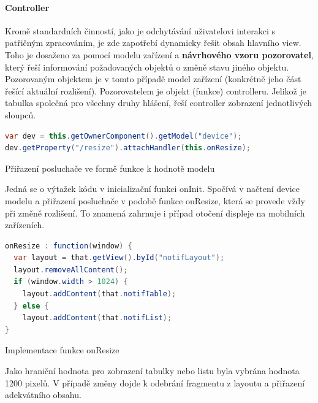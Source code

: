 \documentclass[thesis=M,czech]{FITthesis}[2012/06/26]
\begin{document}
\paragraph{Controller}
Kromě standardních činností, jako je odchytávání uživatelovi interakci s patřičným zpracováním, je zde zapotřebí dynamicky řešit obsah hlavního view. Toho je dosaženo za pomocí modelu zařízení a \textbf{návrhového vzoru pozorovatel}, který řeší informování požadovaných objektů o změně stavu jiného objektu. Pozorovaným objektem je v tomto případě model zařízení (konkrétně jeho část řešící aktuální rozlišení). Pozorovatelem je objekt (funkce) controlleru. Jelikož je tabulka společná pro všechny druhy hlášení, řeší controller zobrazení jednotlivých sloupců. 
\begin{algorithm}[H]
	\begin{lstlisting}[language=java]     
var dev = this.getOwnerComponent().getModel("device");
dev.getProperty("/resize").attachHandler(this.onResize);
	\end{lstlisting}
	\caption{Přiřazení posluchače ve formě funkce k hodnotě modelu}	
	\label{code:resize_attach_handler}
	\small Jedná se o výtažek kódu v inicializační funkci onInit. Spočívá v načtení device modelu a přiřazení posluchače v podobě funkce onResize, která se provede vždy při změně rozlišení. To znamená zahrnuje i případ otočení displeje na mobilních zařízeních.
\end{algorithm}	
\begin{algorithm}[H]
	\begin{lstlisting}[language=java]      
onResize : function(window) {
  var layout = that.getView().byId("notifLayout");
  layout.removeAllContent();
  if (window.width > 1024) {
    layout.addContent(that.notifTable);
  } else {
    layout.addContent(that.notifList);
}
	\end{lstlisting}
	\caption{Implementace funkce onResize}
	\label{code:resize_handler}
	\small Jako hraniční hodnota pro zobrazení tabulky nebo listu byla vybrána hodnota 1200 pixelů. V případě změny dojde k odebrání fragmentu z layoutu a přiřazení adekvátního obsahu.
\end{algorithm}	
\end{document}
